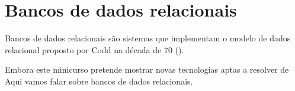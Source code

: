 \section{Bancos de dados relacionais}

Bancos de dados relacionais são sistemas que implementam o modelo de dados
relacional proposto por Codd na década de 70 (\cite{Codd1970}).

Embora este minicurso pretende mostrar novas tecnologias aptas a resolver de 
Aqui vamos falar sobre bancos de dados relacionais.
